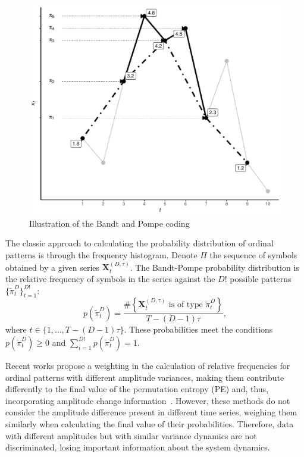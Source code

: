 \documentclass[journal]{IEEEtran}
\begin{document}
\begin{figure}[hbt]
	\centering
	\includegraphics[width=.9\linewidth]{Figures/IntroBP.pdf}
	\caption{Illustration of the Bandt and Pompe coding\label{Fig:IntroBP}}
\end{figure}

The classic approach to calculating the probability distribution of ordinal patterns is through the frequency histogram.
Denote $\Pi$ the sequence of symbols obtained by a given series $\mathbf{X}_t^{(D,\tau)}$.
The Bandt-Pompe probability distribution is the relative frequency of symbols in the series against the $D!$ possible patterns $\{\widetilde\pi_t^D \}_{t = 1}^{D!}$:
%
\begin{equation}
	p(\widetilde\pi_t^D) = \frac{\#\left \{\mathbf{X}_t^{(D,\tau)} \text{ is of type } \widetilde\pi_t^D\right \}}{T- (D-1)\tau},  
\end{equation}
where  $t\in \{1, \dots, T-(D-1)\tau\}$.
These probabilities meet the conditions $p(\widetilde\pi_t^D) \ge 0$ and  $\sum_{i=1}^{D!} p(\widetilde\pi_t^D) = 1$.

Recent works propose a weighting in the calculation of relative frequencies for ordinal patterns with different amplitude variances, making them contribute differently to the final value of the permutation entropy (PE) and, thus, incorporating amplitude change information~\cite{Fadlallah2013Weightedpermutation}.
However, these methods do not consider the amplitude difference present in different time series, weighing them similarly when calculating the final value of their probabilities.
Therefore, data with different amplitudes but with similar variance dynamics are not discriminated, losing important information about the system dynamics.
\end{document}
